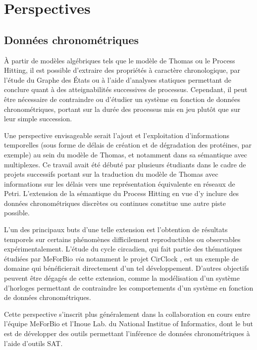 \chapter{Perspectives}
\label{chap:perspectives}

\section{Données chronométriques}

À partir de modèles algébriques tels que le modèle de Thomas ou le Process Hitting, il est possible d'extraire des propriétés à caractère chronologique,
par l'étude du Graphe des États ou à l'aide d'analyses statiques permettant de conclure quant à des atteignabilités successives de processus.
Cependant, il peut être nécessaire de contraindre ou d'étudier un système en fonction de données chronométriques, portant sur la durée des processus mis en jeu plutôt que sur leur simple succession.

Une perspective envisageable serait l'ajout et l'exploitation d'informations temporelles (sous forme de délais de création et de dégradation des protéines, par exemple) au sein du modèle de Thomas, et notamment dans sa sémantique avec multiplexes.
Ce travail avait été débuté par plusieurs étudiants dans le cadre de projets successifs portant sur la traduction du modèle de Thomas avec informations sur les délais vers une représentation équivalente en réseaux de Petri.
L'extension de la sémantique du Process Hitting en vue d'y inclure des données chronométriques discrètes ou continues constitue une autre piste possible.

L'un des principaux buts d'une telle extension est l'obtention de résultats temporels sur certains phénomènes difficilement reproductibles ou observables expérimentalement.
L'étude du cycle circadien, qui fait partie des thématiques étudiées par MeForBio \textit{via} notamment le projet CirClock , est un exemple de domaine qui bénéficierait directement d'un tel développement.
D'autres objectifs peuvent être dégagés de cette extension, comme la modélisation d'un système d'horloges permettant de contraindre les comportements d'un système en fonction de données chronométriques.

Cette perspective s'inscrit plus généralement dans la collaboration en cours entre l'équipe MeForBio et l'Inoue Lab. du National Institue of Informatics,
dont le but est de développer des outils permettant l'inférence de données chronométriques à l'aide d'outils SAT.



